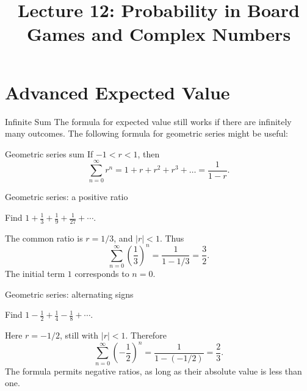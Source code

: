 \title{Lecture 12: Probability in Board Games and Complex Numbers}

\frame{\titlepage}

\section[Expected]{Advanced Expected Value}
\frame{\sectionpage}

\begin{frame}{Infinite Sum}
The formula for expected value still works if there are infinitely many outcomes. The following formula for geometric series might be useful:
\begin{block}{Geometric series sum}
If $-1 < r < 1$, then
\[ \sum_{n=0}^{\infty} r^n = 1 + r + r^2 + r^3 + \ldots = \frac{1}{1-r}.\]
\end{block}
\end{frame}
\begin{frame}[t]{Geometric series: a positive ratio}
\small
\begin{ex}
Find $1+\frac13+\frac19+\frac1{27}+\cdots$.
\end{ex}
\begin{sol}
The common ratio is $r=1/3$, and $|r|<1$. Thus\[\sum_{n=0}^{\infty}\left(\frac13\right)^n=\frac{1}{1-1/3}=\frac32.\] The initial term $1$ corresponds to $n=0$.
\end{sol}
\end{frame}

\begin{frame}[t]{Geometric series: alternating signs}
\small
\begin{ex}
Find $1-\frac12+\frac14-\frac18+\cdots$.
\end{ex}
\begin{sol}
Here $r=-1/2$, still with $|r|<1$. Therefore\[\sum_{n=0}^{\infty}\left(-\frac12\right)^n=\frac{1}{1-(-1/2)}=\frac23.\] The formula permits negative ratios, as long as their absolute value is less than one.
\end{sol}
\end{frame}



